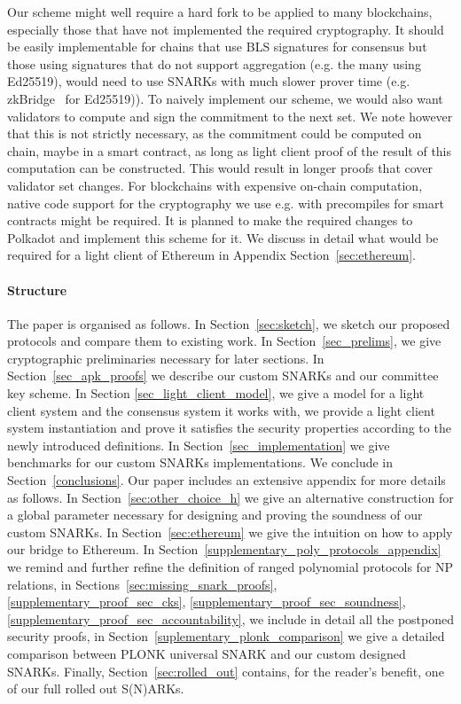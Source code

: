 \noindent Our scheme might well require a hard fork to be applied to many blockchains, especially those that have not implemented the required cryptography. It should be easily implementable for chains that use BLS signatures for consensus but those using signatures that do not support aggregation (e.g. the many using Ed25519), would need to use SNARKs with much slower prover time (e.g. zkBridge~\cite{zkBridge} for Ed25519)). To naively implement our scheme, we would also want validators to compute and sign the commitment to the next set. We note however that this is not strictly necessary, as the commitment could be computed on chain, maybe in a smart contract, as long as light client proof of the result of this computation can be constructed. This would result in longer proofs that cover validator set changes. For blockchains with expensive on-chain computation, native code support for the cryptography we use e.g. with precompiles for smart contracts might be required. It is planned to make the required changes to Polkadot and implement this scheme for it. We discuss in detail what would be required for a light client of Ethereum in Appendix Section~\ref{sec:ethereum}. \\
\vspace{-0.1in}
\paragraph{Structure} The paper is organised as follows. 
In Section~\ref{sec:sketch}, we sketch our proposed protocols and compare 
them to existing work. In Section~\ref{sec_prelims}, we give cryptographic 
preliminaries necessary for later sections. In Section~\ref{sec_apk_proofs}
we describe our custom SNARKs and our committee key scheme. In Section \ref{sec_light_client_model}, 
we give a model for a light client system and the consensus system it works with, we provide a light client system 
instantiation and prove it satisfies the security properties according to the newly 
introduced definitions. In Section~\ref{sec_implementation} we give benchmarks for our custom SNARKs 
implementations. We conclude in Section~\ref{conclusions}. Our paper includes 
an extensive appendix for more details as follows. In Section~\ref{sec:other_choice_h} 
we give an alternative construction for a global parameter necessary for designing and 
proving the soundness of our custom SNARKs. In Section~\ref{sec:ethereum} we give the 
intuition on how to apply our bridge to Ethereum. In Section~\ref{supplementary_poly_protocols_appendix} 
we remind and further refine the definition of ranged polynomial protocols for NP relations, 
in Sections~\ref{sec:missing_snark_proofs}, \ref{supplementary_proof_sec_cks}, 
\ref{supplementary_proof_sec_soundness}, \ref{supplementary_proof_sec_accountability}, 
we include in detail all the postponed security proofs, in Section~\ref{suplementary_plonk_comparison} 
we give a detailed comparison between PLONK universal SNARK and our custom designed SNARKs. 
Finally, Section~\ref{sec:rolled_out} contains, for the reader's benefit, one of our full rolled out S(N)ARKs. 
\vspace{-0.25cm}
